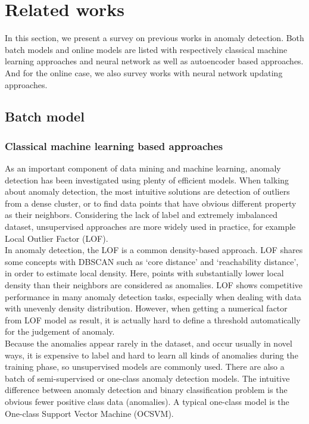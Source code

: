 \chapter{Related works}
\label{chap:relatedworks}

In this section, we present a survey on previous works in anomaly detection. Both batch models and online models are listed with respectively classical machine learning approaches and neural network as well as autoencoder based approaches. And for the online case, we also survey works with neural network updating approaches.

\section{Batch model}
\label{sec:batch}

\subsection{Classical machine learning based approaches}
\label{sec:classical}

As an important component of data mining and machine learning, anomaly detection has been investigated using plenty of efficient models. When talking about anomaly detection, the most intuitive solutions are detection of outliers from a dense cluster, or to find data points that have obvious different property as their neighbors. Considering the lack of label and extremely imbalanced dataset, unsupervised approaches are more widely used in practice, for example Local Outlier Factor (LOF).\\

In anomaly detection, the LOF is a common density-based approach. LOF shares some concepts with DBSCAN such as ‘core distance’ and ‘reachability distance’, in order to estimate local density. Here, points with substantially lower local density than their neighbors are considered as anomalies. LOF shows competitive performance in many anomaly detection tasks, especially when dealing with data with unevenly density distribution. However, when getting a numerical factor from LOF model as result, it is actually hard to define a threshold automatically for the judgement of anomaly.\\

Because the anomalies appear rarely in the dataset, and occur usually in novel ways, it is expensive to label and hard to learn all kinds of anomalies during the training phase, so unsupervised models are commonly used. There are also a batch of semi-supervised or one-class anomaly detection models. The intuitive difference between anomaly detection and binary classification problem is the obvious fewer positive class data (anomalies). A typical one-class model is the One-class Support Vector Machine (OCSVM).\\

